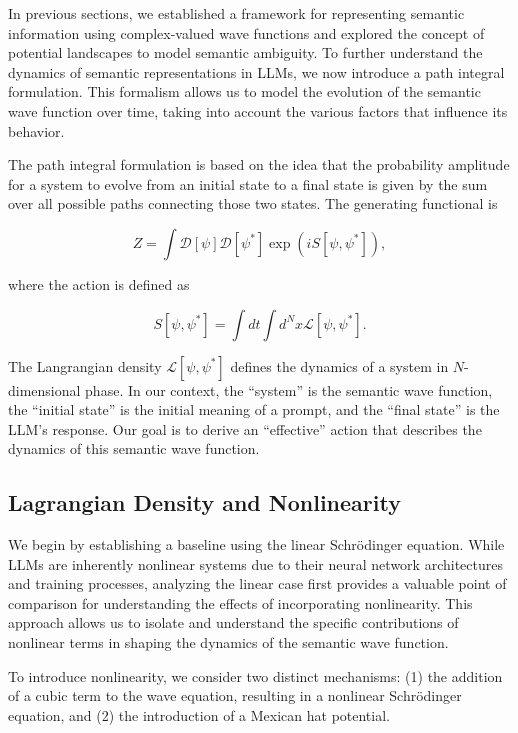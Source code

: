 \documentclass[prd,amsmath,amssymb,12pt]{revtex4}
\begin{document}
In previous sections, we established a framework for representing semantic information using complex-valued
wave functions and explored the concept of potential landscapes to model semantic ambiguity. To further
understand the dynamics of semantic representations in LLMs, we now introduce a path integral formulation.
This formalism allows us to model the evolution of the semantic wave function over time, taking into
account the various factors that influence its behavior.

The path integral formulation is based on the idea that the probability amplitude for a system to evolve
from an initial state to a final state is given by the sum over all possible paths connecting those two states.
The generating functional is

\begin{equation}
    Z = \int  \mathcal{D}[\psi] \mathcal{D}[\psi^*]
     \exp\left(i S[\psi, \psi^*] \right),
\end{equation}

\noindent
where the action is defined as

\begin{equation}
    S[\psi, \psi^*] = \int dt \int d^N x \mathcal{L}[\psi, \psi^*].
\end{equation}


\noindent
The Langrangian density $\mathcal{L}[\psi, \psi^*]$ defines the dynamics of a system
in $N$-dimensional phase.
In our context, the ``system'' is the semantic wave function, the ``initial state'' is the initial meaning of a prompt,
and the ``final state'' is the LLM's response. Our goal is to derive an ``effective'' action that describes the
dynamics of this semantic wave function.

\subsection{Lagrangian Density and Nonlinearity}

We begin by establishing a baseline using the linear Schrödinger equation. While LLMs
are inherently nonlinear systems due to their neural network architectures and training processes, analyzing
the linear case first provides a valuable point of comparison for understanding the effects of incorporating
nonlinearity. This approach allows us to isolate and understand the specific contributions of nonlinear
terms in shaping the dynamics of the semantic wave function.

To introduce nonlinearity, we consider two distinct mechanisms: (1) the addition of a cubic term to the
wave equation, resulting in a nonlinear Schrödinger equation, and (2) the introduction of a Mexican hat potential.
\end{document}
